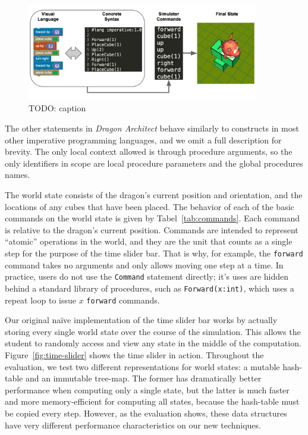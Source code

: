 \documentclass{sig-alternate}
\newcommand{\da}{\emph{Dragon Architect}}
\newcommand{\todo}[1]{{\color{red} TODO: #1}}
\begin{document}
\begin{figure}[ht!]
  \centering
  \includegraphics[width=0.9\textwidth]{images/phases}
  \caption{\todo{caption}}
  \label{fig:phases}
\end{figure}

The other statements in \da{} behave similarly to constructs in most other imperative programming languages, and we omit a full description for brevity. The only local context allowed is through procedure arguments, so the only identifiers in scope are local procedure parameters and the global procedures names.

The world state consists of the dragon's current position and orientation, and the locations of any cubes that have been placed.  The behavior of each of the basic commands on the world state is given by Tabel~\ref{tab:commands}. Each command is relative to the dragon's current position. Commands are intended to represent ``atomic'' operations in the world, and they are the unit that counts as a single step for the purpose of the time slider bar. That is why, for example, the \texttt{forward} command takes no arguments and only allows moving one step at a time. In practice, users do not use the \texttt{Command} statement directly; it's uses are hidden behind a standard library of procedures, such as \texttt{Forward(x:int)}, which uses a repeat loop to issue $x$ \texttt{forward} commands.

Our original na\"{i}ve implementation of the time slider bar works by actually storing every single world state over the course of the simulation. This allows the student to randomly access and view any state in the middle of the computation. Figure~\ref{fig:time-slider} shows the time slider in action. Throughout the evaluation, we test two different representations for world states: a mutable hash-table and an immutable tree-map. The former has dramatically better performance when computing only a single state, but the latter is much faster and more memory-efficient for computing all states, because the hash-table must be copied every step. However, as the evaluation shows, these data structures have very different performance characteristics on our new techniques.
\end{document}
